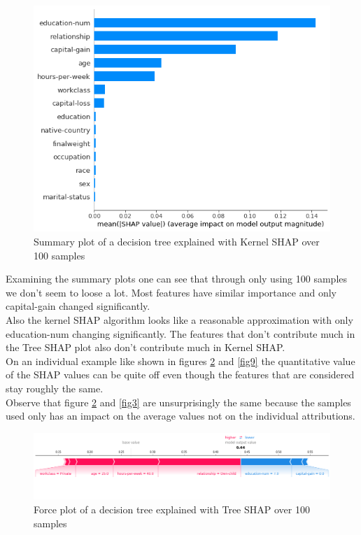\documentclass[conference]{IEEEtran}
\begin{document}
\begin{figure}[htbp]
\centerline{
	\includegraphics[width=\linewidth]{../fig/ex_02_KernelShap_100_Samples_SummaryPlot.png}
}
\caption{Summary plot of a decision tree explained with Kernel SHAP over 100 samples}
\label{fig7}
\end{figure}

Examining the summary plots one can see that through only using 100 samples we don't seem to loose a lot. Most features have similar importance and only capital-gain changed significantly.\\
Also the kernel SHAP algorithm looks like a reasonable approximation with only education-num changing significantly. 
The features that don't contribute much in the Tree SHAP plot also don't contribute much in Kernel SHAP.\\
On an individual example like shown in figures \ref{fig8} and \ref{fig9} the quantitative value of the SHAP values can be quite off even though the features that are considered stay roughly the same.\\
Observe that figure \ref{fig8} and \ref{fig3} are unsurprisingly the same because the samples used only has an impact on the average values not on the individual attributions.

\begin{figure}[htbp]
\centerline{
	\includegraphics[width=\textwidth]{../fig/ex_02_TreeShap_100_Samples_ForcePlot_sample_1.png}
}
\caption{Force plot of a decision tree explained with Tree SHAP over 100 samples}
\label{fig8}
\end{figure}
\end{document}
